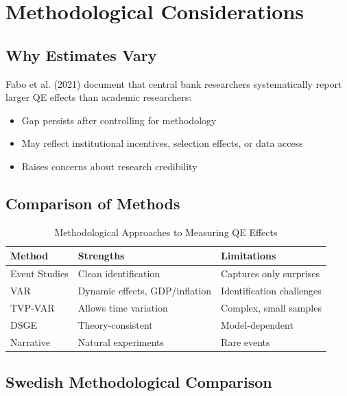 \documentclass[11pt,a4paper]{article}
\begin{document}
\section{Methodological Considerations}

\subsection{Why Estimates Vary}

Fabo et al. (2021) document that central bank researchers systematically report larger QE effects than academic researchers:
\begin{itemize}
    \item Gap persists after controlling for methodology
    \item May reflect institutional incentives, selection effects, or data access
    \item Raises concerns about research credibility
\end{itemize}

\subsection{Comparison of Methods}

\begin{table}[H]
\centering
\caption{Methodological Approaches to Measuring QE Effects}
\label{tab:methods}
\begin{tabular}{lll}
\toprule
\textbf{Method} & \textbf{Strengths} & \textbf{Limitations} \\
\midrule
Event Studies & Clean identification & Captures only surprises \\
VAR & Dynamic effects, GDP/inflation & Identification challenges \\
TVP-VAR & Allows time variation & Complex, small samples \\
DSGE & Theory-consistent & Model-dependent \\
Narrative & Natural experiments & Rare events \\
\bottomrule
\end{tabular}
\end{table}

\subsection{Swedish Methodological Comparison}
\end{document}
